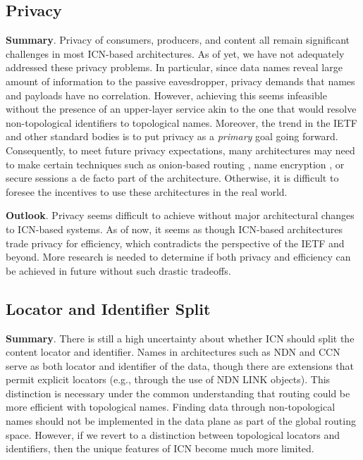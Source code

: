 \subsection{Privacy}
{\bf Summary}. Privacy of consumers, producers, and content all remain significant
challenges in most ICN-based architectures. As of yet, we have not adequately addressed
these privacy problems. In particular, since data names reveal large amount of information to
the passive eavesdropper, privacy demands that names and payloads have no correlation.
However, achieving this seems infeasible without the presence of an upper-layer service
akin to the one that would resolve non-topological identifiers to topological names.
Moreover, the trend in the IETF and other standard bodies is to put privacy as a \emph{primary} goal going forward. Consequently,
to meet future privacy expectations, many architectures may need to make certain techniques
such as onion-based routing \cite{uzun2011anonymous}, name encryption \cite{privacy}, or secure
sessions \cite{wood-icnrg-ccnxkeyexchange-01} a de facto part of the architecture.
Otherwise, it is difficult to foresee the incentives to use these architectures in the
real world.

{\bf Outlook}. Privacy seems difficult to achieve without major architectural changes to
ICN-based systems. As of now, it seems as though ICN-based architectures trade privacy
for efficiency, which contradicts the perspective of the IETF and beyond. More
research is needed to determine if both privacy and efficiency can be achieved in
future without such drastic tradeoffs.

\subsection{Locator and Identifier Split}
{\bf Summary}. There is still a high uncertainty about whether ICN should split the content
locator and identifier. Names in architectures such as NDN and CCN serve as both
locator and identifier of the data, though there are extensions that permit explicit locators
(e.g., through the use of NDN LINK objects). This distinction is necessary under the common understanding that
routing could be more efficient with topological names. Finding
data through non-topological names should not be implemented in the data plane as part of the global
routing space. However, if we revert to a distinction between topological locators and
identifiers, then the unique features of ICN become much more limited.

